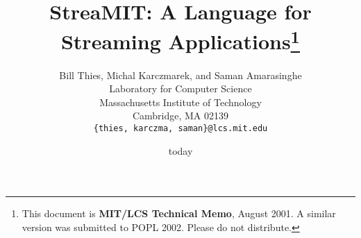 \documentclass[psfig]{acm_proc_article-sp}
\begin{document}
\title{StreaMIT: A Language for Streaming Applications\thanks{This
document is {\bf MIT/LCS Technical Memo}, August 2001.  A similar
version was submitted to POPL 2002.  Please do not distribute.}}

\author{
\alignauthor Bill Thies, Michal Karczmarek, and Saman Amarasinghe\\
	\vspace{12pt}
	Laboratory for Computer Science \\
	Massachusetts Institute of Technology \\
	Cambridge, MA  02139 \\
	\vspace{12pt}
	{\tt \{thies, karczma, saman\}@lcs.mit.edu}
}

\date{today}

\newcommand{\ma}[2]{max_{#1 \rightarrow #2}}
\newcommand{\mal}[1]{maxloop_{#1 \rightarrow #1}}
\newcommand{\mi}[2]{min_{#1 \leftarrow #2}}

\maketitle

\begin{abstract}

\end{abstract}










\vspace{.5in}


\end{document}
